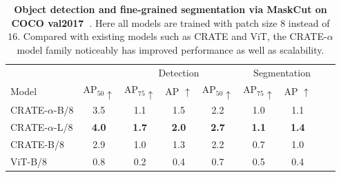 \documentclass[../../book-main.tex]{subfiles}
\begin{document}
\begin{table}[b]
    \centering
    \begin{tabular}{@{}lcccccccc@{}}
    \toprule
     &  & \multicolumn{3}{c}{Detection} &  \multicolumn{3}{c}{Segmentation} \\ 
    Model & AP$_{50} \uparrow $ & AP$_{75} \uparrow $ & AP $\uparrow$ & AP$_{50} \uparrow$ & AP$_{75} \uparrow $ & AP $\uparrow$ \\ 
    \midrule
    \midrule
    CRATE-\(\alpha\)-B/8 & 3.5 & 1.1 & 1.5 & 2.2 & 1.0 & 1.1 \\
    CRATE-\(\alpha\)-L/8 & \textbf{4.0} & \textbf{1.7} & \textbf{2.0} & \textbf{2.7} & \textbf{1.1} & \textbf{1.4} \\
    \midrule
    \color{gray}CRATE-B/8 & \color{gray}2.9 & \color{gray}1.0 & \color{gray}1.3 & \color{gray}2.2 & \color{gray}0.7 & \color{gray}1.0 \\
    \color{gray}ViT-B/8 & \color{gray}0.8 & \color{gray}0.2 & \color{gray}0.4 & \color{gray}0.7 & \color{gray}0.5 & \color{gray}0.4 \\
    \bottomrule
    \end{tabular}
    \caption{\small \textbf{Object detection and fine-grained segmentation via MaskCut on COCO val2017~\citep{lin2014microsoft}}. Here all models are trained with patch size \(8\) instead of \(16\). Compared with existing models such as CRATE and ViT, the CRATE-\(\alpha\) model family noticeably has improved performance as well as scalability.}
    \label{tab:crate_alpha_detection_segmentation}
\end{table}
\end{document}
